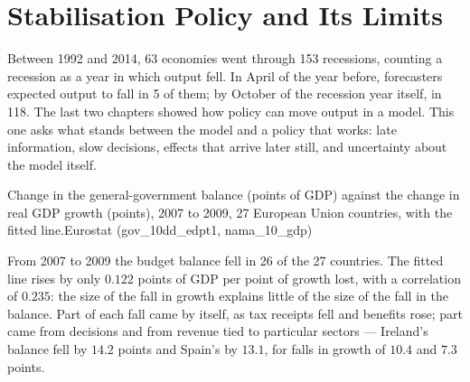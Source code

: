 \chapter{Stabilisation Policy and Its Limits}\label{ch:b1:stabilisation-policy}

Between 1992 and 2014, 63 economies went through 153 recessions, counting
a recession as a year in which output fell. In April of the year before,
forecasters expected output to fall in 5 of them; by October of the
recession year itself, in 118. %
The last two chapters showed how policy can move output in a model. This
one asks what stands between the model and a policy that works: late
information, slow decisions, effects that arrive later still, and
uncertainty about the model itself.

\begin{openingchart}{Change in the general-government balance (points of GDP)
against the change in real GDP growth (points), 2007 to 2009, 27 European
Union countries, with the fitted line.}{Eurostat (gov\_10dd\_edpt1,
nama\_10\_gdp)}
\end{openingchart}

From 2007 to 2009 the budget balance fell in 26 of the 27 countries. The
fitted line rises by only $0.122$ points of GDP per point of growth lost, with
a correlation of $0.235$: the size of the fall in growth explains little of
the size of the fall in the balance. %
Part of each fall came by itself, as tax receipts fell and benefits rose;
part came from decisions and from revenue tied to particular sectors ---
Ireland's balance fell by $14.2$ points and Spain's by $13.1$, for falls in growth
of $10.4$ and $7.3$ points. %


